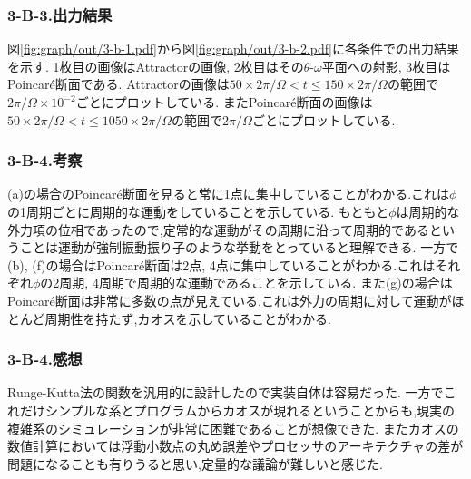 \subsubsection*{3-B-3.出力結果}
図\ref{fig:graph/out/3-b-1.pdf}から図\ref{fig:graph/out/3-b-2.pdf}に各条件での出力結果を示す.
1枚目の画像はAttractorの画像,
2枚目はその$\theta$-$\omega$平面への射影,
3枚目はPoincar\'{e}断面である.
Attractorの画像は$50\times2\pi/\Omega<t\leq150\times2\pi/\Omega$の範囲で$2\pi/\Omega\times10^{-2}$ごとにプロットしている.
またPoincar\'{e}断面の画像は$50\times2\pi/\Omega<t\leq1050\times2\pi/\Omega$の範囲で$2\pi/\Omega$ごとにプロットしている.
\subsubsection*{3-B-4.考察}
(a)の場合のPoincar\'{e}断面を見ると常に1点に集中していることがわかる.これは$\phi$の1周期ごとに周期的な運動をしていることを示している.
もともと$\phi$は周期的な外力項の位相であったので,定常的な運動がその周期に沿って周期的であるということは運動が強制振動振り子のような挙動をとっていると理解できる.
一方で(b), (f)の場合はPoincar\'{e}断面は2点, 4点に集中していることがわかる.これはそれぞれ$\phi$の2周期, 4周期で周期的な運動であることを示している.
また(g)の場合はPoincar\'{e}断面は非常に多数の点が見えている.これは外力の周期に対して運動がほとんど周期性を持たず,カオスを示していることがわかる.
\subsubsection*{3-B-4.感想}
Runge-Kutta法の関数を汎用的に設計したので実装自体は容易だった.
一方でこれだけシンプルな系とプログラムからカオスが現れるということからも,現実の複雑系のシミュレーションが非常に困難であることが想像できた.
またカオスの数値計算においては浮動小数点の丸め誤差やプロセッサのアーキテクチャの差が問題になることも有りうると思い,定量的な議論が難しいと感じた.
\newpage
{}
